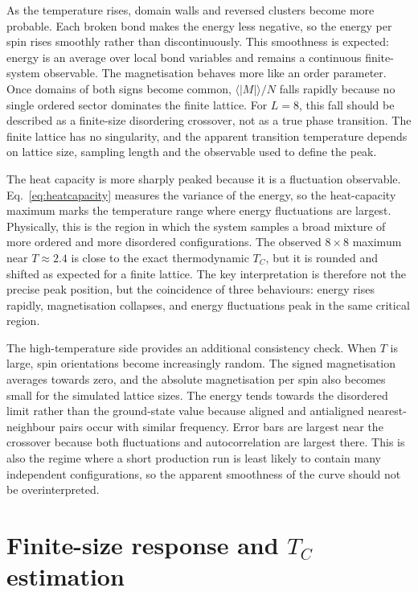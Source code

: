 \documentclass[twoside,twocolumn,9pt]{extarticle}
\begin{document}
As the temperature rises, domain walls and reversed clusters become more probable. Each broken bond makes the energy less negative, so the energy per spin rises smoothly rather than discontinuously. This smoothness is expected: energy is an average over local bond variables and remains a continuous finite-system observable. The magnetisation behaves more like an order parameter. Once domains of both signs become common, \(\langle |M|\rangle/N\) falls rapidly because no single ordered sector dominates the finite lattice. For \(L=8\), this fall should be described as a finite-size disordering crossover, not as a true phase transition. The finite lattice has no singularity, and the apparent transition temperature depends on lattice size, sampling length and the observable used to define the peak.

The heat capacity is more sharply peaked because it is a fluctuation observable. Eq.~\eqref{eq:heatcapacity} measures the variance of the energy, so the heat-capacity maximum marks the temperature range where energy fluctuations are largest. Physically, this is the region in which the system samples a broad mixture of more ordered and more disordered configurations. The observed \(8 \times 8\) maximum near \(T\approx2.4\) is close to the exact thermodynamic \(T_C\), but it is rounded and shifted as expected for a finite lattice. The key interpretation is therefore not the precise peak position, but the coincidence of three behaviours: energy rises rapidly, magnetisation collapses, and energy fluctuations peak in the same critical region.

The high-temperature side provides an additional consistency check. When \(T\) is large, spin orientations become increasingly random. The signed magnetisation averages towards zero, and the absolute magnetisation per spin also becomes small for the simulated lattice sizes. The energy tends towards the disordered limit rather than the ground-state value because aligned and antialigned nearest-neighbour pairs occur with similar frequency. Error bars are largest near the crossover because both fluctuations and autocorrelation are largest there. This is also the regime where a short production run is least likely to contain many independent configurations, so the apparent smoothness of the curve should not be overinterpreted.

\section{Finite-size response and \texorpdfstring{\(T_C\)}{TC} estimation}
\end{document}
